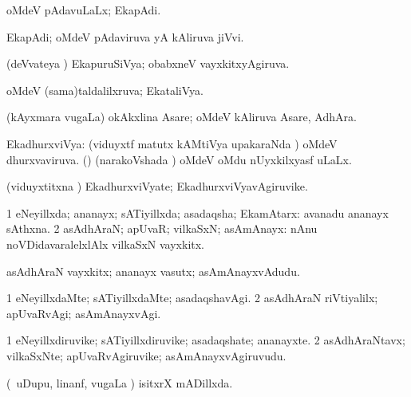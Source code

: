 {{\bentry
{} 
\gl{\gu}
\expl{}
\bmng
oMdeV pAdavuLaLx; EkapAdi. 
\emng
\eentry

\bentry
{} 
\gl{\nA}
\expl{}
\bmng
EkapAdi; oMdeV pAdaviruva yA kAliruva jiVvi. 
\emng
\eentry

\bentry
{} 
\gl{\gu}
\expl{}
\bmng
(deVvateya \vi) EkapuruSiVya; obabxneV vayxkitxyAgiruva. 
\emng
\eentry

\bentry
{} 
\gl{\gu}
\expl{}
\bmng
oMdeV (sama)taldalilxruva; EkataliVya. 
\emng
\eentry

\bentry
{} 
\gl{\nA}
\expl{}
\bmng
(kAyxmara \mo vugaLa) okAkxlina Asare; oMdeV kAliruva Asare, AdhAra. 
\emng
\eentry

\bentry
{} 
\gl{\gu}
\expl{}
\bmng
EkadhurxviVya: 
\banum
{} (viduyxtf matutx kAMtiVya upakaraNda \vi) oMdeV dhurxvaviruva. 
 (\jiVvi) (narakoVshada \vi) oMdeV oMdu nUyxkilxyasf uLaLx. 
\eanum
\emng
\eentry

\bentry
{} 
\gl{\nA}
\expl{}
\bmng
(viduyxtitxna \vi) EkadhurxviVyate; EkadhurxviVyavAgiruvike. 
\emng
\eentry

\bentry
{} 
\gl{\gu}
\expl{}
\bmng
\bnum
\num{1} eNeyillxda; ananayx; sATiyillxda; asadaqsha; EkamAtarx:  avanadu ananayx sAthxna. 
\num{2} asAdhAraN; apUvaR; vilkaSxN; asAmAnayx:  nAnu noVDidavaralelxlAlx vilkaSxN vayxkitx. 
\enum
\emng
\eentry

\bentry
{} 
\gl{\nA}
\expl{}
\bmng
asAdhAraN vayxkitx; ananayx vasutx; asAmAnayxvAdudu. 
\emng
\eentry

\bentry
{} 
\gl{\kirxvi}
\expl{}
\bmng
\bnum
\num{1} eNeyillxdaMte; sATiyillxdaMte; asadaqshavAgi. 
\num{2} asAdhAraN riVtiyalilx; apUvaRvAgi; asAmAnayxvAgi. 
\enum
\emng
\eentry

\bentry
{} 
\gl{\nA}
\expl{}
\bmng
\bnum
\num{1} eNeyillxdiruvike; sATiyillxdiruvike; asadaqshate; ananayxte. 
\num{2} asAdhAraNtavx; vilkaSxNte; apUvaRvAgiruvike; asAmAnayxvAgiruvudu. 
\enum
\emng
\eentry

\bentry
{} 
\gl{\gu}
\expl{}
\bmng
(\kanmu\ uDupu, linanf, \mo vugaLa \vi) isitxrX mADillxda. 
\emng
\eentry

}}
